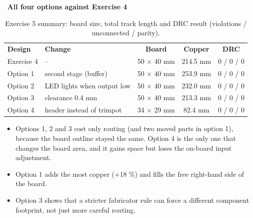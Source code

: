\documentclass[11pt,a4paper]{article}
\newcommand{\lab}[2]{\Needspace{5\baselineskip}\vspace{6pt}{\sffamily\bfseries\color{teal}\large #1}\ {\sffamily\bfseries\color{ink}#2}\par\vspace{-2pt}{\color{amber}\rule{2.2em}{1.4pt}}\par\vspace{2pt}}
\begin{document}
\lab{Summary}{All four options against Exercise 4}
\begin{table}[H]\centering\small\sffamily
\begin{tabular}{@{}llccc@{}}\rowcolor{teal}\color{white}\textbf{Design}&\color{white}\textbf{Change}&\color{white}\textbf{Board}&\color{white}\textbf{Copper}&\color{white}\textbf{DRC}\\
Exercise 4&--&50 $\times$ 40 mm&214.5 mm&0 / 0 / 0\\
\rowcolor{mist}Option 1&second stage (buffer)&50 $\times$ 40 mm&253.9 mm&0 / 0 / 0\\
Option 2&LED lights when output low&50 $\times$ 40 mm&232.0 mm&0 / 0 / 0\\
\rowcolor{mist}Option 3&clearance 0.4 mm&50 $\times$ 40 mm&213.3 mm&0 / 0 / 0\\
Option 4&header instead of trimpot&34 $\times$ 29 mm&82.4 mm&0 / 0 / 0\\\end{tabular}
\caption{Exercise 5 summary: board size, total track length and DRC result (violations / unconnected / parity).}\end{table}
\begin{itemize}
\item Options 1, 2 and 3 cost only routing (and two moved parts in option 1), because the board outline stayed the same. Option 4 is the only one that changes the board area, and it gains space but loses the on-board input adjustment.
\item Option 1 adds the most copper (+18 \%) and fills the free right-hand side of the board.
\item Option 3 shows that a stricter fabricator rule can force a different component footprint, not just more careful routing.
\end{itemize}
\end{document}
